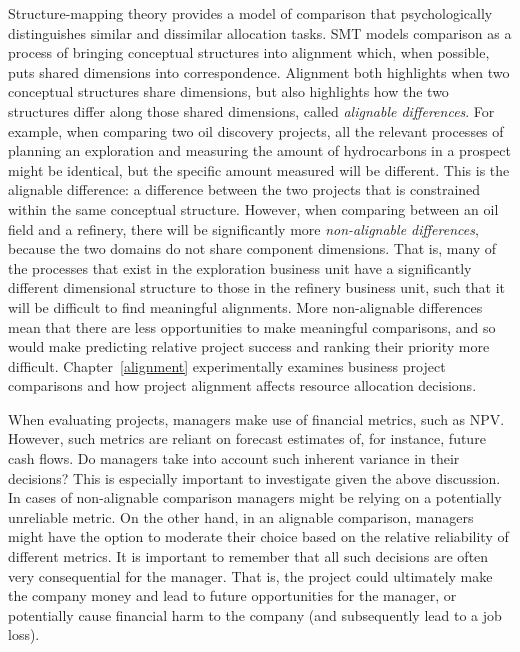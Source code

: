 \documentclass[a4paper, nobind, dvipsnames]{templates/ociamthesis}
\theoremstyle{definition}
\theoremstyle{definition}
\theoremstyle{definition}
\theoremstyle{definition}
\theoremstyle{remark}
\begin{document}
Structure-mapping theory \autocites[SMT;][]{gentner1997,gentner1983} provides a model of
comparison that psychologically distinguishes similar and dissimilar allocation
tasks. SMT models comparison as a process of bringing conceptual structures into
alignment which, when possible, puts shared dimensions into correspondence.
Alignment both highlights when two conceptual structures share dimensions, but
also highlights how the two structures differ along those shared dimensions,
called \emph{alignable differences}. For example, when comparing two oil discovery
projects, all the relevant processes of planning an exploration and measuring
the amount of hydrocarbons in a prospect might be identical, but the specific
amount measured will be different. This is the alignable difference: a
difference between the two projects that is constrained within the same
conceptual structure. However, when comparing between an oil field and a
refinery, there will be significantly more \emph{non-alignable differences}, because
the two domains do not share component dimensions. That is, many of the
processes that exist in the exploration business unit have a significantly
different dimensional structure to those in the refinery business unit, such
that it will be difficult to find meaningful alignments. More non-alignable
differences mean that there are less opportunities to make meaningful
comparisons, and so would make predicting relative project success and ranking
their priority more difficult. Chapter~\ref{alignment} experimentally examines
business project comparisons and how project alignment affects resource
allocation decisions.

When evaluating projects, managers make use of financial metrics, such as NPV.
However, such metrics are reliant on forecast estimates of, for instance, future
cash flows. Do managers take into account such inherent variance in their
decisions? This is especially important to investigate given the above
discussion. In cases of non-alignable comparison managers might be relying on a
potentially unreliable metric. On the other hand, in an alignable comparison,
managers might have the option to moderate their choice based on the relative
reliability of different metrics. It is important to remember that all such
decisions are often very consequential for the manager. That is, the project
could ultimately make the company money and lead to future opportunities for the
manager, or potentially cause financial harm to the company (and subsequently
lead to a job loss).
\end{document}
